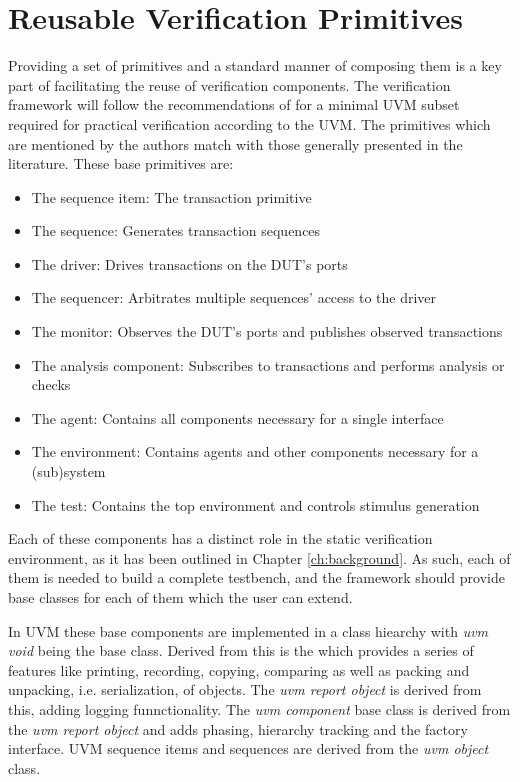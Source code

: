 \section{Reusable Verification Primitives} %

Providing a set of primitives and a standard manner of composing them is a key part of facilitating the reuse of
verification components. The verification framework will follow the recommendations of \citeauthor{sutherland2015uvm}
\cite{sutherland2015uvm} for a minimal UVM subset required for practical verification according to the UVM. The
primitives which are mentioned by the authors match with those generally presented in the literature. These base primitives are:

\begin{itemize}
  \item The sequence item: The transaction primitive
  \item The sequence: Generates transaction sequences
  \item The driver: Drives transactions on the DUT's ports
  \item The sequencer: Arbitrates multiple sequences' access to the driver
  \item The monitor: Observes the DUT's ports and publishes observed transactions
  \item The analysis component: Subscribes to transactions and performs analysis or checks
  \item The agent: Contains all components necessary for a single interface
  \item The environment: Contains agents and other components necessary for a (sub)system
  \item The test: Contains the top environment and controls stimulus generation
\end{itemize}

Each of these components has a distinct role in the static verification environment, as it has been outlined in
Chapter \ref{ch:background}. As such, each of them is needed to build a complete testbench, and the framework should
provide base classes for each of them which the user can extend.

In UVM these base components are implemented in a class hiearchy with \textit{uvm void} being the base class. Derived
from this is the  which provides a series of features like printing, recording, copying, comparing
as well as packing and unpacking, i.e. serialization, of objects. The \textit{uvm report object} is derived from
this, adding logging funnctionality. The \textit{uvm component} base class is derived from the \textit{uvm report
object} and adds phasing, hierarchy tracking and the factory interface. UVM sequence items and sequences are derived
from the \textit{uvm object} class.

